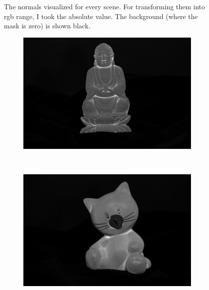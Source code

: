 \documentclass{paper}
\begin{document}
\begin{figure}[h!]
\begin{subfigure}{0.3\textwidth}
        \end{subfigure}
        \caption{The normals visualized for every scene. For transforming
         them into rgb range, I took the absolute value. The background 
         (where the mask is zero) is shown black. }
        \label{fig:normals}
\end{figure}
\begin{figure}[h!]
        \centering
        \begin{subfigure}{0.3\textwidth}
                \includegraphics[width=\textwidth]{report_fig/buddha_a}
        \end{subfigure}
        ~ 
        \begin{subfigure}{0.3\textwidth}
                \includegraphics[width=\textwidth]{report_fig/cat_a}
        \end{subfigure}
        ~ 
        \begin{subfigure}{0.3\textwidth}

\end{subfigure}
\end{figure}
\end{document}
